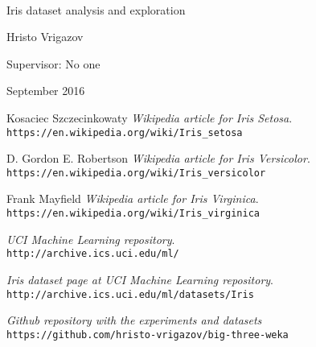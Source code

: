 \documentclass[11pt,a4paper,oldfontcommands]{memoir}
\begin{document}
%
%
\thispagestyle{empty}

{%
\sffamily
\centering
\Large

~\vspace{\fill}

{\huge 
Iris dataset analysis and exploration
}

\vspace{2.5cm}

{\LARGE
Hristo Vrigazov
}

\vspace{3.5cm}


\vspace{3.5cm}

Supervisor: No one

\vspace{\fill}

September 2016

}%

\cleardoublepage

\tableofcontents*

\clearpage




\begin{thebibliography}{9}

Kosaciec Szczecinkowaty
\textit{Wikipedia article for Iris Setosa}. 
\\\texttt{https://en.wikipedia.org/wiki/Iris\_setosa}

D. Gordon E. Robertson
\textit{Wikipedia article for Iris Versicolor}. 
\\\texttt{https://en.wikipedia.org/wiki/Iris\_versicolor}

Frank Mayfield
\textit{Wikipedia article for Iris Virginica}. 
\\\texttt{https://en.wikipedia.org/wiki/Iris\_virginica}

\textit{UCI Machine Learning repository}. 
\\\texttt{http://archive.ics.uci.edu/ml/}

\textit{Iris dataset page at UCI Machine Learning repository}. 
\\\texttt{http://archive.ics.uci.edu/ml/datasets/Iris}

\textit{Github repository with the experiments and datasets}
\\\texttt{https://github.com/hristo-vrigazov/big-three-weka}


\end{thebibliography}
\end{document}
